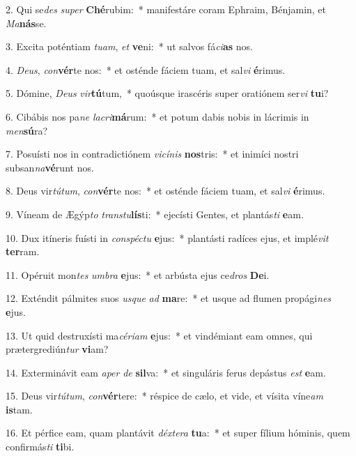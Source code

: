 2. Qui se\textit{des} \textit{su}\textit{per} \textbf{Ché}rubim:~*  manifestáre coram Ephraim, Bénjamin, et \textit{Ma}\textbf{nás}se.\

3. Excita poténtiam \textit{tu}\textit{am}, \textit{et} \textbf{ve}ni:~*  ut salvos fá\textit{ci}\textbf{as} nos.\

4. \textit{De}\textit{us}, \textit{con}\textbf{vér}te nos:~*  et osténde fáciem tuam, et sal\textit{vi} \textbf{é}rimus.\

5. Dómine, \textit{De}\textit{us} \textit{vir}\textbf{tú}tum,~*  quoúsque irascéris super oratiónem ser\textit{vi} \textbf{tu}i?\

6. Cibábis nos pa\textit{ne} \textit{la}\textit{cri}\textbf{má}rum:~*  et potum dabis nobis in lácrimis in \textit{men}\textbf{sú}ra?\

7. Posuísti nos in contradictiónem \textit{vi}\textit{cí}\textit{nis} \textbf{nos}tris:~*  et inimíci nostri subsan\textit{na}\textbf{vé}runt nos.\

8. Deus vir\textit{tú}\textit{tum}, \textit{con}\textbf{vér}te nos:~*  et osténde fáciem tuam, et sal\textit{vi} \textbf{é}rimus.\

9. Víneam de Ægýp\textit{to} \textit{trans}\textit{tu}\textbf{lís}ti:~*  ejecísti Gentes, et plantás\textit{ti} \textbf{e}am.\

10. Dux itíneris fuísti in \textit{con}\textit{spéc}\textit{tu} \textbf{e}jus:~*  plantásti radíces ejus, et implé\textit{vit} \textbf{ter}ram.\

11. Opéruit mon\textit{tes} \textit{um}\textit{bra} \textbf{e}jus:~*  et arbústa ejus ce\textit{dros} \textbf{De}i.\

12. Exténdit pálmites suos \textit{us}\textit{que} \textit{ad} \textbf{ma}re:~*  et usque ad flumen propági\textit{nes} \textbf{e}jus.\

13. Ut quid destruxísti ma\textit{cé}\textit{ri}\textit{am} \textbf{e}jus:~*  et vindémiant eam omnes, qui prætergrediún\textit{tur} \textbf{vi}am?\

14. Exterminávit eam \textit{a}\textit{per} \textit{de} \textbf{sil}va:~*  et singuláris ferus depástus \textit{est} \textbf{e}am.\

15. Deus vir\textit{tú}\textit{tum}, \textit{con}\textbf{vér}tere:~*  réspice de cælo, et vide, et vísita víne\textit{am} \textbf{is}tam.\

16. Et pérfice eam, quam plantávit \textit{déx}\textit{te}\textit{ra} \textbf{tu}a:~*  et super fílium hóminis, quem confirmás\textit{ti} \textbf{ti}bi.\

